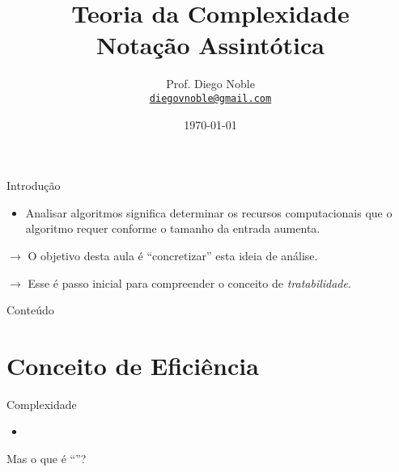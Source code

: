 \documentclass[
    mode=present,
    style=dvn,
    paper=screen,
    display=slidesnotes,
    size=14pt,
]{powerdot}
\title{Teoria da Complexidade \\
    \small Notação Assintótica\\}
\author{\smallskip Prof. Diego Noble \\%
\texttt{\href{mailto:diegovnoble@gmail.com}{\color{pdcolor4}diegovnoble@gmail.com}}}%
\date{\today}
\theoremstyle{plain}
\theoremstyle{definition}
\theoremstyle{remark}
\begin{document}
\maketitle

\begin{slide}{Introdução}
    \begin{itemize}
        \item Analisar algoritmos significa determinar os recursos computacionais que
        o algoritmo requer conforme o tamanho da entrada aumenta.
    \end{itemize}
    \bigskip
    
    $\rightarrow$ O objetivo desta aula é ``concretizar'' esta ideia de análise.\pause

    $\rightarrow$ Esse é passo inicial para compreender o conceito de \textit{tratabilidade}.
\end{slide}


\begin{slide}{Conteúdo}
    \Large
    \tableofcontents[content=sections]
\end{slide}
\section{Conceito de Eficiência}
\begin{slide}{Complexidade}
    \Large
    \begin{itemize}
    \item {}
    \end{itemize}
    Mas o que é ``''?
\end{slide}
\end{document}

